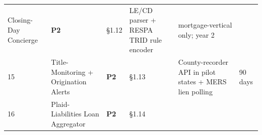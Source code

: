 \documentclass[
  10pt,
]{article}
\begin{document}
\begin{longtable}[]{@{}llllll@{}}
\begin{minipage}[t]{0.14\columnwidth}
Closing-Day Concierge\strut
\end{minipage} & \begin{minipage}[t]{0.14\columnwidth}\raggedright
\textbf{P2}\strut
\end{minipage} & \begin{minipage}[t]{0.14\columnwidth}\raggedright
§1.12\strut
\end{minipage} & \begin{minipage}[t]{0.14\columnwidth}\raggedright
LE/CD parser + RESPA TRID rule encoder\strut
\end{minipage} & \begin{minipage}[t]{0.14\columnwidth}\raggedright
mortgage-vertical only; year 2\strut
\end{minipage}\tabularnewline
\begin{minipage}[t]{0.14\columnwidth}\raggedright
15\strut
\end{minipage} & \begin{minipage}[t]{0.14\columnwidth}\raggedright
Title-Monitoring + Origination Alerts\strut
\end{minipage} & \begin{minipage}[t]{0.14\columnwidth}\raggedright
\textbf{P2}\strut
\end{minipage} & \begin{minipage}[t]{0.14\columnwidth}\raggedright
§1.13\strut
\end{minipage} & \begin{minipage}[t]{0.14\columnwidth}\raggedright
County-recorder API in pilot states + MERS lien polling\strut
\end{minipage} & \begin{minipage}[t]{0.14\columnwidth}\raggedright
90 days\strut
\end{minipage}\tabularnewline
\begin{minipage}[t]{0.14\columnwidth}\raggedright
16\strut
\end{minipage} & \begin{minipage}[t]{0.14\columnwidth}\raggedright
Plaid-Liabilities Loan Aggregator\strut
\end{minipage} & \begin{minipage}[t]{0.14\columnwidth}\raggedright
\textbf{P2}\strut
\end{minipage} & \begin{minipage}[t]{0.14\columnwidth}\raggedright
§1.14\strut
\end{minipage} & \begin{minipage}[t]{0.14\columnwidth}\raggedright

\end{minipage}
\end{longtable}
\end{document}
